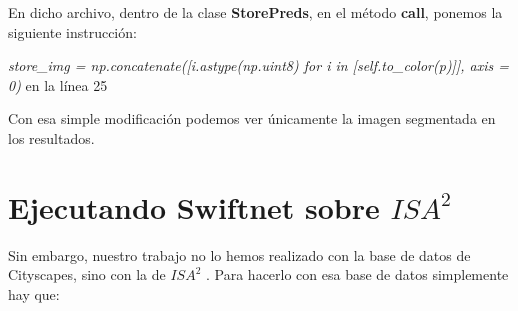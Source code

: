En dicho archivo, dentro de la clase \textbf{StorePreds}, en el método \textbf{call}, ponemos la siguiente instrucción:

\begin{center}
\textit{store\_img = np.concatenate([i.astype(np.uint8) for i in [self.to\_color(p)]], axis = 0)} en la línea 25
\end{center}

Con esa simple modificación podemos ver únicamente la imagen segmentada en los resultados.

\section{Ejecutando Swiftnet sobre $ISA^{2}$}

Sin embargo, nuestro trabajo no lo hemos realizado con la base de datos de Cityscapes, sino con la de $ISA^{2}$ \cite{isa2}. Para hacerlo con esa base de datos simplemente hay que:

